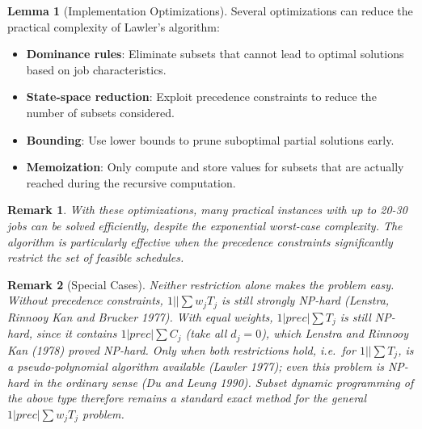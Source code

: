 \documentclass{article}
\newtheorem{remark}{Remark}
\theoremstyle{definition}
\newtheorem{lemma}{Lemma}
\begin{document}
\begin{lemma}[Implementation Optimizations]
Several optimizations can reduce the practical complexity of Lawler's algorithm:

\begin{itemize}
    \item \textbf{Dominance rules}: Eliminate subsets that cannot lead to optimal solutions based on job characteristics.
    \item \textbf{State-space reduction}: Exploit precedence constraints to reduce the number of subsets considered.
    \item \textbf{Bounding}: Use lower bounds to prune suboptimal partial solutions early.
    \item \textbf{Memoization}: Only compute and store values for subsets that are actually reached during the recursive computation.
\end{itemize}

\begin{remark}
With these optimizations, many practical instances with up to 20-30 jobs can be solved efficiently, despite the exponential worst-case complexity. The algorithm is particularly effective when the precedence constraints significantly restrict the set of feasible schedules.
\end{remark}
\end{lemma}

\begin{remark}[Special Cases]
Neither restriction alone makes the problem easy. Without precedence constraints, $1||\sum w_jT_j$ is still strongly NP-hard (Lenstra, Rinnooy Kan and Brucker 1977). With equal weights, $1|prec|\sum T_j$ is still NP-hard, since it contains $1|prec|\sum C_j$ (take all $d_j = 0$), which Lenstra and Rinnooy Kan (1978) proved NP-hard. Only when both restrictions hold, i.e.\ for $1||\sum T_j$, is a pseudo-polynomial algorithm available (Lawler 1977); even this problem is NP-hard in the ordinary sense (Du and Leung 1990). Subset dynamic programming of the above type therefore remains a standard exact method for the general $1|prec|\sum w_jT_j$ problem.
\end{remark}
\end{document}
